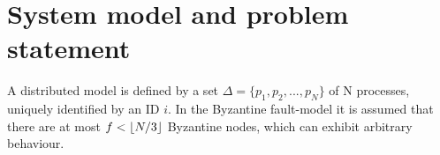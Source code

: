 \section{System model and problem statement}
\label{system-model}



A distributed model is defined by a set $\Delta=\{p_1, p_2,...,p_N\}$ of N processes, uniquely identified by an ID $i$. In the Byzantine fault-model it is assumed that there are at most $f < \lfloor N/3\rfloor$ Byzantine nodes, which can exhibit arbitrary behaviour. 

